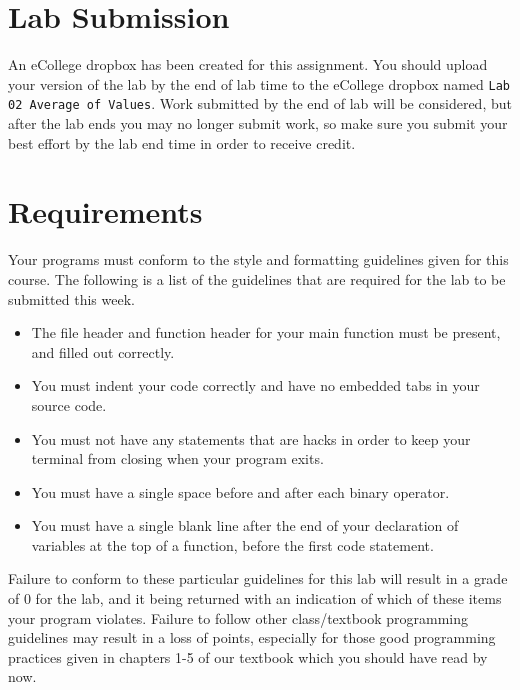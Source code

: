 \documentclass[11pt]{article}
\begin{document}
\section*{Lab Submission}
\label{sec-4}


An eCollege dropbox has been created for this assignment.  You should
upload your version of the lab by the end of lab time to the eCollege
dropbox named \verb~Lab 02 Average of Values~.  Work submitted by the end
of lab will be considered, but after the lab ends you may no longer
submit work, so make sure you submit your best effort by the lab end
time in order to receive credit.
\section*{Requirements}
\label{sec-5}

Your programs must conform to the style and formatting guidelines given for this course.
The following is a list of the guidelines that are required for the lab to be submitted
this week.

\begin{itemize}
\item The file header and function header for your main function must be present, and filled out correctly.
\item You must indent your code correctly and have no embedded tabs in your source code.
\item You must not have any statements that are hacks in order to keep your terminal from closing when your program exits.
\item You must have a single space before and after each binary operator.
\item You must have a single blank line after the end of your declaration
  of variables at the top of a function, before the first code
  statement.
\end{itemize}

Failure to conform to these particular guidelines for this lab will
result in a grade of 0 for the lab, and it being returned with an
indication of which of these items your program violates.  Failure to
follow other class/textbook programming guidelines may result in a
loss of points, especially for those good programming practices given
in chapters 1-5 of our textbook which you should have read by now.
\end{document}
